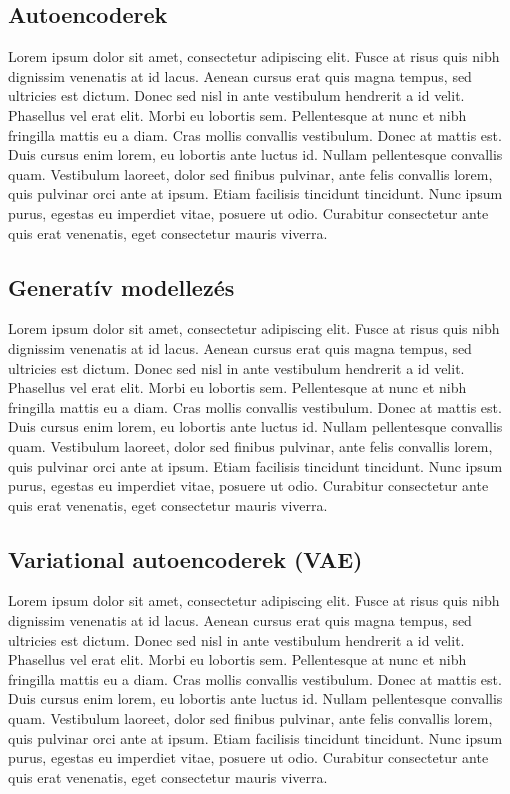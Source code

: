 \documentclass[12pt]{article}
\begin{document}
\subsection{Autoencoderek}

Lorem ipsum dolor sit amet, consectetur adipiscing elit. Fusce at risus quis nibh dignissim venenatis at id lacus. Aenean cursus erat quis magna tempus, sed ultricies est dictum. Donec sed nisl in ante vestibulum hendrerit a id velit. Phasellus vel erat elit. Morbi eu lobortis sem. Pellentesque at nunc et nibh fringilla mattis eu a diam. Cras mollis convallis vestibulum. Donec at mattis est. Duis cursus enim lorem, eu lobortis ante luctus id. Nullam pellentesque convallis quam. Vestibulum laoreet, dolor sed finibus pulvinar, ante felis convallis lorem, quis pulvinar orci ante at ipsum. Etiam facilisis tincidunt tincidunt. Nunc ipsum purus, egestas eu imperdiet vitae, posuere ut odio. Curabitur consectetur ante quis erat venenatis, eget consectetur mauris viverra.

\subsection{Generatív modellezés}

Lorem ipsum dolor sit amet, consectetur adipiscing elit. Fusce at risus quis nibh dignissim venenatis at id lacus. Aenean cursus erat quis magna tempus, sed ultricies est dictum. Donec sed nisl in ante vestibulum hendrerit a id velit. Phasellus vel erat elit. Morbi eu lobortis sem. Pellentesque at nunc et nibh fringilla mattis eu a diam. Cras mollis convallis vestibulum. Donec at mattis est. Duis cursus enim lorem, eu lobortis ante luctus id. Nullam pellentesque convallis quam. Vestibulum laoreet, dolor sed finibus pulvinar, ante felis convallis lorem, quis pulvinar orci ante at ipsum. Etiam facilisis tincidunt tincidunt. Nunc ipsum purus, egestas eu imperdiet vitae, posuere ut odio. Curabitur consectetur ante quis erat venenatis, eget consectetur mauris viverra.

\subsection{Variational autoencoderek (VAE)}

Lorem ipsum dolor sit amet, consectetur adipiscing elit. Fusce at risus quis nibh dignissim venenatis at id lacus. Aenean cursus erat quis magna tempus, sed ultricies est dictum. Donec sed nisl in ante vestibulum hendrerit a id velit. Phasellus vel erat elit. Morbi eu lobortis sem. Pellentesque at nunc et nibh fringilla mattis eu a diam. Cras mollis convallis vestibulum. Donec at mattis est. Duis cursus enim lorem, eu lobortis ante luctus id. Nullam pellentesque convallis quam. Vestibulum laoreet, dolor sed finibus pulvinar, ante felis convallis lorem, quis pulvinar orci ante at ipsum. Etiam facilisis tincidunt tincidunt. Nunc ipsum purus, egestas eu imperdiet vitae, posuere ut odio. Curabitur consectetur ante quis erat venenatis, eget consectetur mauris viverra.
\end{document}
